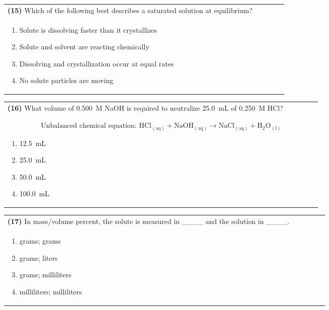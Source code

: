 \documentclass{article}
\begin{document}
\noindent\begin{tabular}{|p{0.9\linewidth}|}
\hline
\textbf{(15)} Which of the following best describes a saturated solution at equilibrium?\\[0.2cm]
\begin{minipage}[t]{0.85\linewidth}
\begin{enumerate}[label=\alph*.]
\item Solute is dissolving faster than it crystallizes
\item Solute and solvent are reacting chemically
\item Dissolving and crystallization occur at equal rates
\item No solute particles are moving
\end{enumerate}
\end{minipage}\\[0.2cm]
\hline
\end{tabular}

\noindent\begin{tabular}{|p{0.9\linewidth}|}
\hline
\textbf{(16)} What volume of 0.500~M NaOH is required to neutralize 25.0~mL of 0.250~M HCl?\\[0.2cm]
\[
\text{Unbalanced chemical equation: } \mathrm{HCl_{(aq)} + NaOH_{(aq)} \rightarrow NaCl_{(aq)} + H_2O_{(l)}}
\]
\begin{minipage}[t]{0.85\linewidth}
\begin{enumerate}[label=\alph*.]
\item 12.5~mL
\item 25.0~mL
\item 50.0~mL
\item 100.0~mL
\end{enumerate}
\end{minipage}\\[0.2cm]
\hline
\end{tabular}
\newpage

\noindent\begin{tabular}{|p{0.9\linewidth}|}
\hline
\textbf{(17)} In mass/volume percent, the solute is measured in \_\_\_\_ and the solution in \_\_\_\_.\\[0.2cm]
\begin{minipage}[t]{0.85\linewidth}
\begin{enumerate}[label=\alph*.]
\item grams; grams
\item grams; liters
\item grams; milliliters
\item milliliters; milliliters
\end{enumerate}
\end{minipage}\\[0.2cm]
\hline
\end{tabular}
\end{document}
